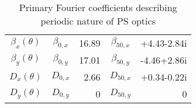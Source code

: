 \begin{table}
    \centering
    \begin{tabular}{c | c  r | c  r }
        $\beta_x(\theta)$ & $\beta_{0,x}$ & 16.89 & $\beta_{50,x}$ & +4.43-2.84i \\
        $\beta_y(\theta)$ & $\beta_{0,y}$ & 17.01 & $\beta_{50,y}$ & -4.46+2.86i \\
        $D_x(\theta)$     & $D_{0,x}$     & 2.66  & $D_{50,x}$     & +0.34-0.22i \\
        $D_y(\theta)$     & $D_{0,y}$     & 0     & $D_{50,y}$     & 0           \\
    \end{tabular}
    \caption{Primary Fourier coefficients describing periodic nature of PS optics}
    \label{tab:ps_optics_fourier}
\end{table}